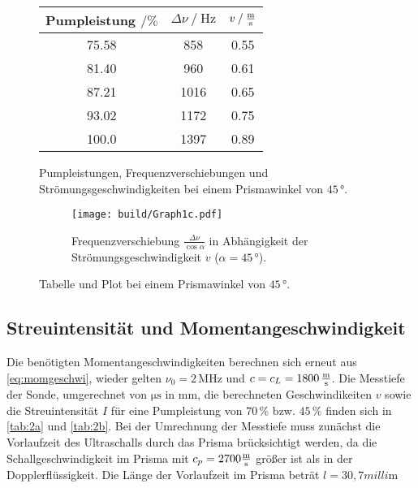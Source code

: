 \begin{figure}
    \begin{subtable}{0.43\textwidth}
        \centering
       \begin{tabular}{c c c}
        \toprule 
        {Pumpleistung $\mathbin{/}\%$} & {$\Delta \nu \mathbin{/} \unit{\hertz}$} & {$v \mathbin{/} \unit{\frac{\meter}{\second}}$}  \\
        \midrule 
                75.58   &     858   & 0.55 \\
                81.40   &     960   & 0.61 \\
                87.21   &     1016  & 0.65 \\
                93.02   &     1172  & 0.75 \\
                100.0   &     1397  & 0.89 \\
        \bottomrule
       \end{tabular}
       \caption{Pumpleistungen, Frequenzverschiebungen und Strömungsgeschwindigkeiten bei einem Prismawinkel von $45 \,°$.}
        \label{tab:1winkel3}
    \end{subtable}
    \begin{subfigure}{0.57\textwidth} 
        \centering
        \texttt{[image: build/Graph1c.pdf]}  
        \caption{Frequenzverschiebung $\frac{\Delta \nu}{\cos\alpha}$ in Abhängigkeit der Strömungsgeschwindigkeit $v$ ($\alpha = 45 \,°$).}
        \label{fig:graph1c}
        \qquad
    \end{subfigure}
    \caption{Tabelle und Plot bei einem Prismawinkel von $45 \,°$.} 
\end{figure}    

\subsection{Streuintensität und Momentangeschwindigkeit}

Die benötigten Momentangeschwindigkeiten berechnen sich erneut aus \eqref{eq:momgeschwi}, wieder gelten $\nu_0 = 2 \,\unit{\mega\hertz}$ und $c = c_L = 1800 \,\unit{\frac{\meter}{\second}}$.
Die Messtiefe der Sonde, umgerechnet von $\unit{\micro\second}$ in $\unit{\milli\meter}$, die berechneten Geschwindikeiten $v$ sowie die Streuintensität $I$ für eine Pumpleistung von $70 \,\%$ bzw. $45 \,\%$ finden sich in \autoref{tab:2a} und \autoref{tab:2b}.
Bei der Umrechnung der Messtiefe muss zunächst die Vorlaufzeit des Ultraschalls durch das Prisma brücksichtigt werden, da die Schallgeschwindigkeit im Prisma mit $c_p = 2700 \unit{\frac{\meter}{\second}}$ größer ist als in der Dopplerflüssigkeit.
Die Länge der Vorlaufzeit im Prisma beträt $ l = 30,7 \unit{milli\meter}$

